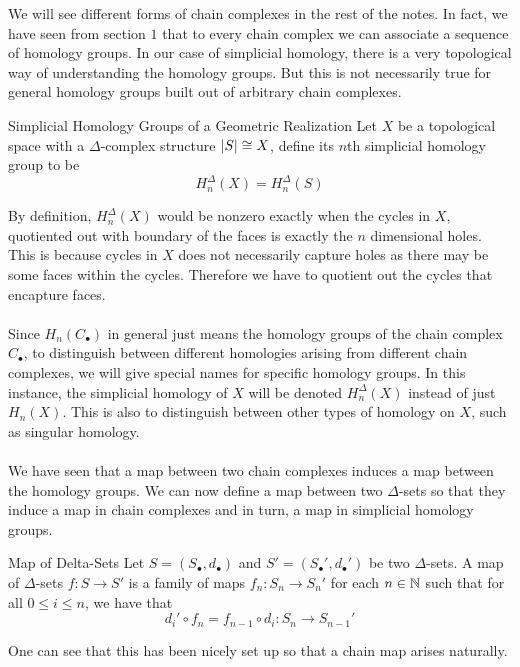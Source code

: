\documentclass[a4paper]{article}
\begin{document}
We will see different forms of chain complexes in the rest of the notes. In fact, we have seen from section $1$ that to every chain complex we can associate a sequence of homology groups. In our case of simplicial homology, there is a very topological way of understanding the homology groups. But this is not necessarily true for general homology groups built out of arbitrary chain complexes. 

\begin{defn}{Simplicial Homology Groups of a Geometric Realization}{} Let $X$ be a topological space with a $\Delta$-complex structure $\abs{S}\cong X$, define its $n$th simplicial homology group to be $$H_n^\Delta(X)=H_n^\Delta(S)$$
\end{defn}

By definition, $H_n^\Delta(X)$ would be nonzero exactly when the cycles in $X$, quotiented out with boundary of the faces is exactly the $n$ dimensional holes. This is because cycles in $X$ does not necessarily capture holes as there may be some faces within the cycles. Therefore we have to quotient out the cycles that encapture faces. \\~\\

Since $H_n(C_\bullet)$ in general just means the homology groups of the chain complex $C_\bullet$, to distinguish between different homologies arising from different chain complexes, we will give special names for specific homology groups. In this instance, the simplicial homology of $X$ will be denoted $H_n^\Delta(X)$ instead of just $H_n(X)$. This is also to distinguish between other types of homology on $X$, such as singular homology. \\~\\

We have seen that a map between two chain complexes induces a map between the homology groups. We can now define a map between two $\Delta$-sets so that they induce a map in chain complexes and in turn, a map in simplicial homology groups. 

\begin{defn}{Map of Delta-Sets}{} Let $S=(S_\bullet,d_\bullet)$ and $S'=(S_\bullet',d_\bullet')$ be two $\Delta$-sets. A map of $\Delta$-sets $f:S\to S'$ is a family of maps $f_n:S_n\to S_n'$ for each $n\in\mathbb{N}$ such that for all $0\leq i\leq n$, we have that $$d_i'\circ f_n=f_{n-1}\circ d_i:S_n\to S_{n-1}'$$
\end{defn}

One can see that this has been nicely set up so that a chain map arises naturally. 
\end{document}
